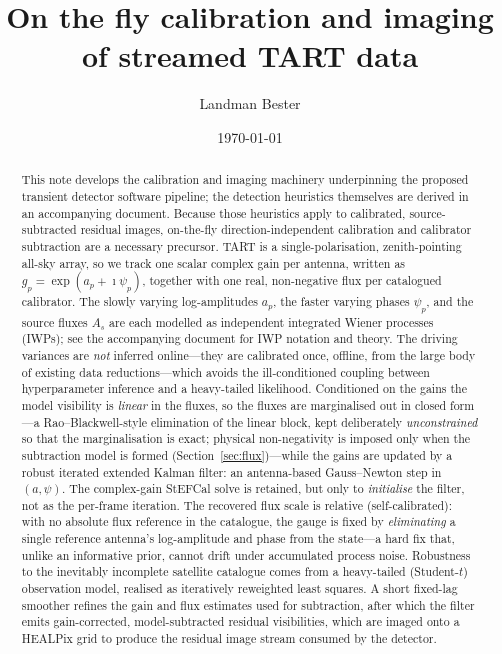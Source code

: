 \documentclass[11pt]{article}
\title{On the fly calibration and imaging of streamed TART data}
\author{Landman Bester}
\date{\today}
\begin{document}
\maketitle

\begin{abstract}
This note develops the calibration and imaging machinery underpinning the proposed transient detector software pipeline; the detection heuristics themselves are derived in an accompanying document. Because those heuristics apply to calibrated, source-subtracted residual images, on-the-fly direction-independent calibration and calibrator subtraction are a necessary precursor. TART is a single-polarisation, zenith-pointing all-sky array, so we track one scalar complex gain per antenna, written as $g_p=\exp(a_p+\imath\psi_p)$, together with one real, non-negative flux per catalogued calibrator. The slowly varying log-amplitudes $a_p$, the faster varying phases $\psi_p$, and the source fluxes $A_s$ are each modelled as independent integrated Wiener processes (IWPs); see the accompanying document for IWP notation and theory. The driving variances are \emph{not} inferred online---they are calibrated once, offline, from the large body of existing data reductions---which avoids the ill-conditioned coupling between hyperparameter inference and a heavy-tailed likelihood. Conditioned on the gains the model visibility is \emph{linear} in the fluxes, so the fluxes are marginalised out in closed form---a Rao--Blackwell-style elimination of the linear block, kept deliberately \emph{unconstrained} so that the marginalisation is exact; physical non-negativity is imposed only when the subtraction model is formed (Section~\ref{sec:flux})---while the gains are updated by a robust iterated extended Kalman filter: an antenna-based Gauss--Newton step in $(a,\psi)$. The complex-gain StEFCal solve is retained, but only to \emph{initialise} the filter, not as the per-frame iteration. The recovered flux scale is relative (self-calibrated): with no absolute flux reference in the catalogue, the gauge is fixed by \emph{eliminating} a single reference antenna's log-amplitude and phase from the state---a hard fix that, unlike an informative prior, cannot drift under accumulated process noise. Robustness to the inevitably incomplete satellite catalogue comes from a heavy-tailed (Student-$t$) observation model, realised as iteratively reweighted least squares. A short fixed-lag smoother refines the gain and flux estimates used for subtraction, after which the filter emits gain-corrected, model-subtracted residual visibilities, which are imaged onto a HEALPix grid to produce the residual image stream consumed by the detector.
\end{abstract}
\end{document}
